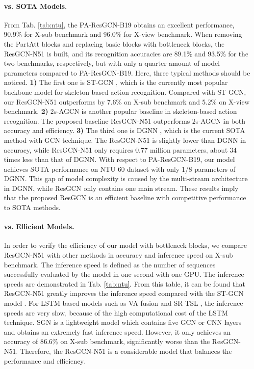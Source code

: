 \documentclass[sigconf]{acmart}
\begin{document}
\paragraph{vs. SOTA Models.} From Tab. \ref{tab:ntu}, the PA-ResGCN-B19 obtains an excellent performance, 90.9\% for X-sub benchmark and 96.0\% for X-view benchmark. When removing the PartAtt blocks and replacing basic blocks with bottleneck blocks, the ResGCN-N51 is built, and its recognition accuracies are 89.1\% and 93.5\% for the two benchmarks, respectively, but with only a quarter amount of model parameters compared to PA-ResGCN-B19. Here, three typical methods should be noticed. {\bf 1)} The first one is ST-GCN \cite{yan2018spatial}, which is the currently most popular backbone model for skeleton-based action recognition. Compared with ST-GCN, our ResGCN-N51 outperforms by 7.6\% on X-sub benchmark and 5.2\% on X-view benchmark. {\bf 2)} 2s-AGCN \cite{shi2019two} is another popular baseline in skeleton-based action recognition. The proposed baseline ResGCN-N51 outperforms 2s-AGCN in both accuracy and efficiency. {\bf 3)} The third one is DGNN \cite{shi2019skeleton}, which is the current SOTA method with GCN technique. The ResGCN-N51 is slightly lower than DGNN in accuracy, while ResGCN-N51 only requires 0.77 million parameters, about 34 times less than that of DGNN. With respect to PA-ResGCN-B19, our model achieves SOTA performance on NTU 60 dataset with only 1/8 parameters of DGNN. This gap of model complexity is caused by the multi-stream architecture in DGNN, while ResGCN only contains one main stream. These results imply that the proposed ResGCN is an efficient baseline with competitive performance to SOTA methods.

\paragraph{vs. Efficient Models.} In order to verify the efficiency of our model with bottleneck blocks, we compare ResGCN-N51 with other methods in accuracy and inference speed on X-sub benchmark. The inference speed is defined as the number of sequences successfully evaluated by the model in one second with one GPU. The inference speeds are demonstrated in Tab. \ref{tab:ntu}. From this table, it can be found that ResGCN-N51 greatly improves the inference speed compared with the ST-GCN model \cite{yan2018spatial}. For LSTM-based models such as VA-fusion \cite{zhang2019view} and SR-TSL \cite{si2018skeleton}, the inference speeds are very slow, because of the high computational cost of the LSTM technique. SGN \cite{zhang2019semantics} is a lightweight model which contains five GCN or CNN layers and obtains an extremely fast inference speed. However, it only achieves an accuracy of 86.6\% on X-sub benchmark, significantly worse than the ResGCN-N51. Therefore, the ResGCN-N51 is a considerable model that balances the performance and efficiency.
\end{document}
